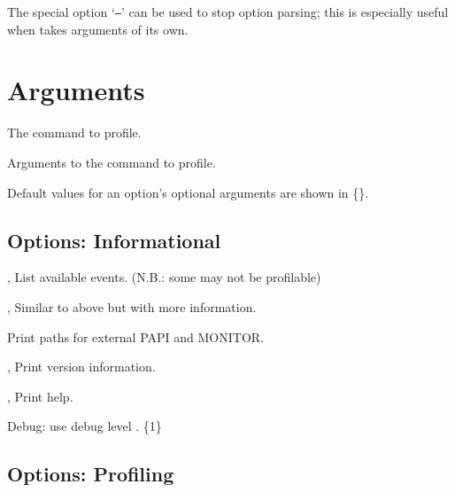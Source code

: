 \documentclass[english]{article}
\begin{document}
The special option `\texttt{--}' can be used to stop  option parsing; this is especially useful when  takes arguments of its own.


\section{Arguments}

\begin{Description}
\item[\Arg{command}] The command to profile.
\item[\Arg{command-arguments}] Arguments to the command to profile.
\end{Description}

Default values for an option's optional arguments are shown in \{\}.

\subsection{Options: Informational}

\begin{Description}
\item[\Opt{-l}, \Opt{--list-events-short}] List available events. (N.B.: some may not be profilable)
\item[\Opt{-L}, \Opt{---list-events-long}] Similar to above but with more information.
\item[\Opt{--paths}] Print paths for external PAPI and MONITOR.
\item[\Opt{-V}, \Opt{--version}] Print version information.
\item[\Opt{-h}, \Opt{--help}] Print help.
\item[\OptoArg{--debug}{n}]   Debug: use debug level . \{1\}
\end{Description}

\subsection{Options: Profiling}
\end{document}
